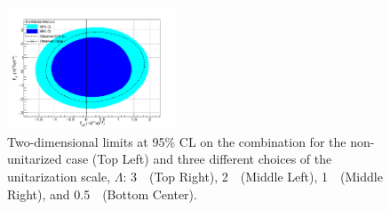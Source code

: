 \begin{figure}[h!]
\begin{center}
\includegraphics[width=0.45\textwidth]{figures/combination/CombUnit-Lim.png}
\end{center}
\caption{Two-dimensional limits at 95\% CL on the combination for the non-unitarized case (Top Left)
and three different choices of the unitarization scale, $\Lambda$:
3~\TeV~(Top Right), 2~\TeV~(Middle Left), 1~\TeV~(Middle Right), and 0.5~\TeV~(Bottom Center).}

 \label{fig:aqgc_combined_2d}
 \end{figure}



